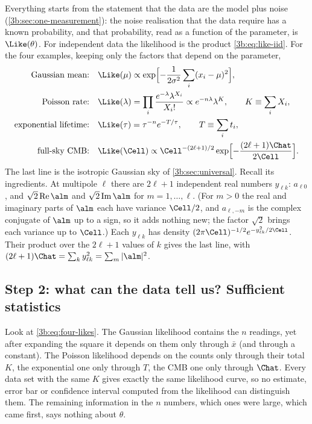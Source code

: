 Everything starts from the statement that the data are the model plus noise
(\cref{3b:sec:one-measurement}): the noise realisation that the data require
has a known probability, and that probability, read as a function of the
parameter, is $\Like(\theta)$. For independent data the likelihood is the
product \eqref{3b:eq:like-iid}. For the four examples, keeping only the
factors that depend on the parameter,
\begin{align}
  \text{Gaussian mean:}\quad &\Like(\mu)\propto
      \exp\Bigl[-\frac1{2\sigma^2}\sum_i(x_i-\mu)^2\Bigr],
  \nonumber\\
  \text{Poisson rate:}\quad &\Like(\lambda)=\prod_i\frac{e^{-\lambda}\lambda^{X_i}}{X_i!}
      \propto e^{-n\lambda}\lambda^{K},\qquad K\equiv\sum_iX_i,
  \nonumber\\
  \text{exponential lifetime:}\quad &\Like(\tau)=\tau^{-n}e^{-T/\tau},\qquad
      T\equiv\sum_it_i,
  \label{3b:eq:four-likes}\\
  \text{full-sky CMB:}\quad &\Like(\Cell)\propto
      \Cell^{-(2\ell+1)/2}\exp\Bigl[-\frac{(2\ell+1)\Chat}{2\Cell}\Bigr].
  \nonumber
\end{align}
The last line is the isotropic Gaussian sky of \cref{3b:sec:universal}.
Recall its ingredients. At multipole $\ell$ there are $2\ell+1$ independent
real numbers $y_{\ell k}$: $a_{\ell0}$, and $\sqrt2\,\mathrm{Re}\,\alm$ and
$\sqrt2\,\mathrm{Im}\,\alm$ for $m=1,\dots,\ell$. (For $m>0$ the real and
imaginary parts of $\alm$ each have variance $\Cell/2$, and $a_{\ell,-m}$ is
the complex conjugate of $\alm$ up to a sign, so it adds nothing new; the
factor $\sqrt2$ brings each variance up to $\Cell$.) Each $y_{\ell k}$ has
density $(2\pi\Cell)^{-1/2}e^{-y_{\ell k}^2/2\Cell}$. Their product over the
$2\ell+1$ values of $k$ gives the last line, with
$(2\ell+1)\Chat=\sum_ky_{\ell k}^2=\sum_m|\alm|^2$.

\subsection{Step 2: what can the data tell us? Sufficient statistics}
\label{3b:sec:recipe-suff}

Look at \eqref{3b:eq:four-likes}. The Gaussian likelihood contains the
$n$ readings, yet after expanding the square it depends on them only through
$\bar x$ (and through a constant). The Poisson likelihood depends on the
counts only through their total $K$, the exponential one only through $T$,
the CMB one only through $\Chat$. Every data set with the same $K$ gives
exactly the same likelihood curve, so no estimate, error bar or confidence
interval computed from the likelihood can distinguish them. The remaining
information in the $n$ numbers, which ones were large, which came first,
says nothing about $\theta$.

